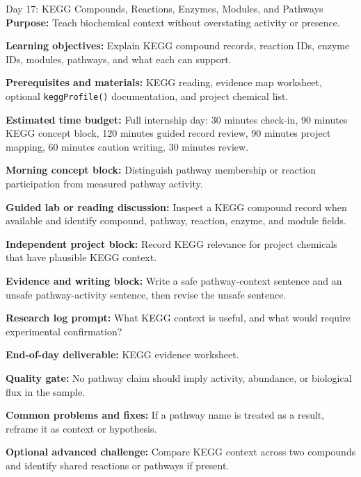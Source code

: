 \begin{dailybox}{Day 17: KEGG Compounds, Reactions, Enzymes, Modules, and Pathways}
\textbf{Purpose:} Teach biochemical context without overstating activity or presence.

\textbf{Learning objectives:} Explain KEGG compound records, reaction IDs, enzyme IDs, modules, pathways, and what each can support.

\textbf{Prerequisites and materials:} KEGG reading, evidence map worksheet, optional \texttt{keggProfile()} documentation, and project chemical list.

\textbf{Estimated time budget:} Full internship day: 30 minutes check-in, 90 minutes KEGG concept block, 120 minutes guided record review, 90 minutes project mapping, 60 minutes caution writing, 30 minutes review.

\textbf{Morning concept block:} Distinguish pathway membership or reaction participation from measured pathway activity.

\textbf{Guided lab or reading discussion:} Inspect a KEGG compound record when available and identify compound, pathway, reaction, enzyme, and module fields.

\textbf{Independent project block:} Record KEGG relevance for project chemicals that have plausible KEGG context.

\textbf{Evidence and writing block:} Write a safe pathway-context sentence and an unsafe pathway-activity sentence, then revise the unsafe sentence.

\textbf{Research log prompt:} What KEGG context is useful, and what would require experimental confirmation?

\textbf{End-of-day deliverable:} KEGG evidence worksheet.

\textbf{Quality gate:} No pathway claim should imply activity, abundance, or biological flux in the sample.

\textbf{Common problems and fixes:} If a pathway name is treated as a result, reframe it as context or hypothesis.

\textbf{Optional advanced challenge:} Compare KEGG context across two compounds and identify shared reactions or pathways if present.
\end{dailybox}

